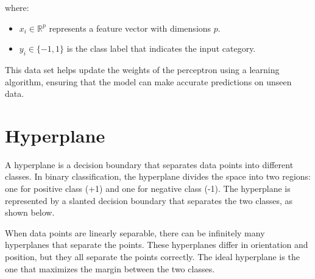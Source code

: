 where:

\begin{itemize}
    \item \( x_i \in \mathbb{R}^p \) represents a feature vector with dimensions \( p \).
    \item \( y_i \in \{-1, 1\} \) is the class label that indicates the input category.
\end{itemize}

This data set helps update the weights of the perceptron using a learning algorithm, ensuring that the model can make accurate predictions on unseen data.


\section{Hyperplane}

A hyperplane is a decision boundary that separates data points into different classes. In binary classification, the hyperplane divides the space into two regions: 
one for positive class (+1) and one for negative class (-1). The hyperplane is represented by a slanted decision boundary that separates the two classes, as shown below. 

\begin{center}
\end{center}

When data points are linearly separable, there can be infinitely many hyperplanes that separate the points. These hyperplanes differ in orientation and position, but they all separate the points correctly. The ideal hyperplane is the one that maximizes the margin between the two classes.

